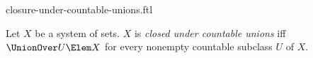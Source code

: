 \documentclass{stex}
\begin{document}
\begin{smodule}{closure-under-countable-unions.ftl}



\begin{definition*}[forthel,for={closed under countable unions}]
  Let $X$ be a system of sets.
  $X$ is \emph{closed under countable unions} iff $\UnionOver U \Elem X$ for every nonempty countable subclass $U$ of $ X$.
\end{definition*}

\end{smodule}
\end{document}
